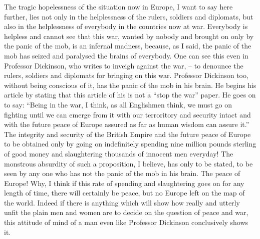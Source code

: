The tragic hopelessness of the situation now in Europe, I want to say here further, lies not only in the helplessness of the rulers, soldiers and diplomats, but also in the helplessness of everybody in the countries now at war.
Everybody is helpless and cannot see that this war, wanted by nobody and brought on only by the panic of the mob, is an infernal madness,
because, as I said, the panic of the mob has seized and paralysed the brains of everybody.
One can see this even in Professor Dickinson,
who writes to inveigh against the war,
-- to denounce the rulers, soldiers and diplomats for bringing on this war. Professor Dickinson too, without being conscious of it, has the panic of the mob in his brain. He begins his article by stating that this article of his is not a ``stop the war'' paper.
He goes on to say:
``Being in the war, I think, as all Englishmen think, we must go on fighting until we can emerge from it with our terroritory and security intact and with the future peace of Europe assured as far as human wisdom can assure it.''
The integrity and security of the British Empire and the future peace of Europe to be obtained only by going on indefinitely spending nine million pounds sterling of good money and slaughtering thousands of innocent men everyday!
The monstrous absurdity of such a proposition, I believe, has only to be stated,
to be seen by any one who has not the panic of the mob in his brain.
The peace of Europe!
Why, I think if this rate of spending and slaughtering goes on for any length of time,
there will certainly be peace, but no Europe left on the map of the world.
Indeed if there is anything which will show how really and utterly unfit the plain men and women are to decide on the question of peace and war,
this attitude of mind of a man even like Professor Dickinson conclusively shows it.

